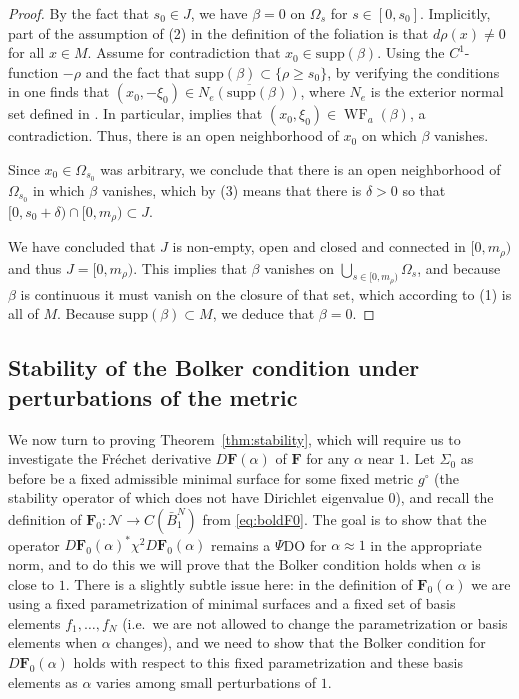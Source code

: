 \documentclass[11pt]{amsart}
\DeclareMathOperator{\WF}{WF}
\theoremstyle{definition}
\numberwithin{equation}{section}
\newcommand{\ol}[1]{\overline{#1}}
\newcommand{\supp}{\mathrm{supp}}
\begin{document}
\begin{proof}
	By the fact that $s_0\in J$, we have $\beta = 0$ on $\Omega_s$ for $s\in [0,s_0]$. Implicitly, part of the assumption of (2) in the definition of the foliation is that $d\rho(x)\neq 0$ for all $x\in M$. Assume for contradiction that $x_0\in \supp(\beta)$. Using the $C^1$-function $-\rho$ and the fact that $\supp(\beta)\subset \{\rho \geq s_0\}$, by verifying the conditions in \cite[Prop.~8.5.8]{hoermander1} one finds that $(x_0,-\xi_0)\in \ol{N_e(\supp(\beta))}$, where $N_e$ is the exterior normal set defined in \cite[Def.~8.5.7]{hoermander1}. In particular, \cite[Thm.~8.5.6']{hoermander1} implies that $(x_0,\xi_0) \in \WF_a(\beta)$, a contradiction. Thus, there is an open neighborhood of $x_0$ on which $\beta$ vanishes. 

	Since $x_0\in \Omega_{s_0}$ was arbitrary, we conclude that there is an open neighborhood of $\Omega_{s_0}$ in which $\beta$ vanishes, which by (3) means that there is $\delta>0$ so that $[0,s_0+\delta) \cap [0,m_\rho)\subset J$. 

	We have concluded that $J$ is non-empty, open and closed and connected in $[0,m_\rho)$ and thus $J=[0,m_\rho)$. This implies that $\beta$ vanishes on $\bigcup_{s\in [0,m_\rho)}\Omega_s$, and because $\beta$ is continuous it must vanish on the closure of that set, which according to (1) is all of $M$. Because $\supp(\beta) \subset M$, we deduce that $\beta=0$.
\end{proof}


\subsection{Stability of the Bolker condition under perturbations of the metric}

We now turn to proving Theorem~\ref{thm:stability}, which will require us to investigate the Fr\'echet derivative $D\mathbf{F}(\alpha)$ of $\mathbf{F}$ for any $\alpha$ near $1$. Let $\Sigma_0$ as before be a fixed admissible minimal surface for some fixed metric $g^\circ$ (the stability operator of which does not have Dirichlet eigenvalue $0$), and recall the definition of $\mathbf{F}_0 \colon  \mathcal{N} \to C(\bar{B}_1^{N})$ from \eqref{eq:boldF0}. The goal is to show that the operator $D\mathbf{F}_0(\alpha)^\ast \chi^2 D\mathbf{F}_0(\alpha)$ remains a $\Psi$DO for $\alpha\approx 1$ in the appropriate norm, and to do this we will prove that the Bolker condition holds when $\alpha$ is close to $1$. There is a slightly subtle issue here: in the definition of $\mathbf{F}_0(\alpha)$ we are using a fixed parametrization of minimal surfaces and a fixed set of basis elements $f_1, \ldots, f_{N}$ (i.e.\ we are not allowed to change the parametrization or basis elements when $\alpha$ changes), and we need to show that the Bolker condition for $D\mathbf{F}_0(\alpha)$ holds with respect to this fixed parametrization and these basis elements as $\alpha$ varies among small perturbations of $1$.
\end{document}
